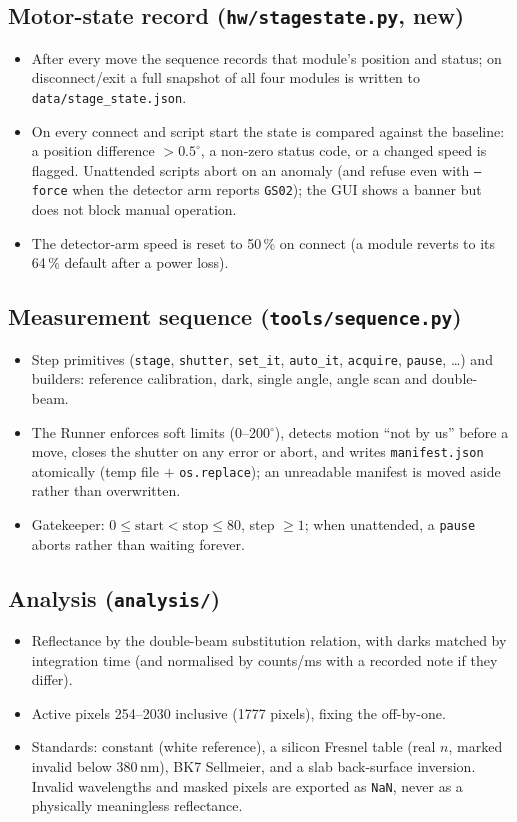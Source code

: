 \documentclass[11pt]{article}
\newcommand{\code}[1]{\texttt{\small #1}}
\begin{document}
\subsection{Motor-state record (\code{hw/stagestate.py}, new)}
\begin{itemize}
\item After every move the sequence records that module's position and status; on disconnect/exit a
full snapshot of all four modules is written to \code{data/stage\_state.json}.
\item On every connect and script start the state is compared against the baseline: a position
difference $>0.5^\circ$, a non-zero status code, or a changed speed is flagged. Unattended scripts
abort on an anomaly (and refuse even with \code{--force} when the detector arm reports \code{GS02});
the GUI shows a banner but does not block manual operation.
\item The detector-arm speed is reset to 50\,\% on connect (a module reverts to its 64\,\% default
after a power loss).
\end{itemize}

\subsection{Measurement sequence (\code{tools/sequence.py})}
\begin{itemize}
\item Step primitives (\code{stage}, \code{shutter}, \code{set\_it}, \code{auto\_it}, \code{acquire},
\code{pause}, \dots) and builders: reference calibration, dark, single angle, angle scan and
double-beam.
\item The Runner enforces soft limits (0--200$^\circ$), detects motion ``not by us'' before a move,
closes the shutter on any error or abort, and writes \code{manifest.json} atomically (temp file $+$
\code{os.replace}); an unreadable manifest is moved aside rather than overwritten.
\item Gatekeeper: $0 \le \text{start} < \text{stop} \le 80$, step $\ge 1$; when unattended, a
\code{pause} aborts rather than waiting forever.
\end{itemize}

\subsection{Analysis (\code{analysis/})}
\begin{itemize}
\item Reflectance by the double-beam substitution relation, with darks matched by integration time
(and normalised by counts/ms with a recorded note if they differ).
\item Active pixels 254--2030 inclusive (1777 pixels), fixing the off-by-one.
\item Standards: constant (white reference), a silicon Fresnel table (real $n$, marked invalid below
380\,nm), BK7 Sellmeier, and a slab back-surface inversion. Invalid wavelengths and masked pixels are
exported as \code{NaN}, never as a physically meaningless reflectance.
\end{itemize}
\end{document}
